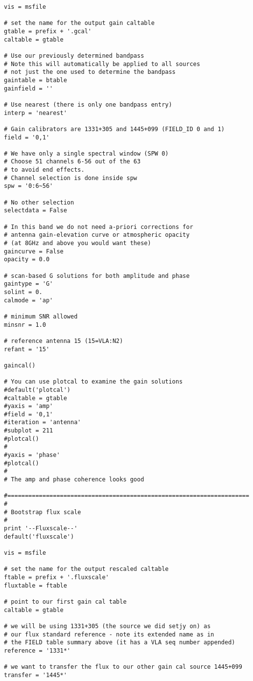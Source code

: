 \begin{verbatim}
vis = msfile

# set the name for the output gain caltable
gtable = prefix + '.gcal'
caltable = gtable

# Use our previously determined bandpass
# Note this will automatically be applied to all sources
# not just the one used to determine the bandpass
gaintable = btable
gainfield = ''

# Use nearest (there is only one bandpass entry)
interp = 'nearest'

# Gain calibrators are 1331+305 and 1445+099 (FIELD_ID 0 and 1)
field = '0,1'

# We have only a single spectral window (SPW 0)
# Choose 51 channels 6-56 out of the 63
# to avoid end effects.
# Channel selection is done inside spw
spw = '0:6~56'

# No other selection
selectdata = False

# In this band we do not need a-priori corrections for
# antenna gain-elevation curve or atmospheric opacity
# (at 8GHz and above you would want these)
gaincurve = False
opacity = 0.0

# scan-based G solutions for both amplitude and phase
gaintype = 'G'
solint = 0.
calmode = 'ap'

# minimum SNR allowed
minsnr = 1.0

# reference antenna 15 (15=VLA:N2)
refant = '15'

gaincal()

# You can use plotcal to examine the gain solutions
#default('plotcal')
#caltable = gtable
#yaxis = 'amp'
#field = '0,1'
#iteration = 'antenna'
#subplot = 211
#plotcal()
#
#yaxis = 'phase'
#plotcal()
#
# The amp and phase coherence looks good

#=====================================================================
#
# Bootstrap flux scale
#
print '--Fluxscale--'
default('fluxscale')

vis = msfile

# set the name for the output rescaled caltable
ftable = prefix + '.fluxscale'
fluxtable = ftable

# point to our first gain cal table
caltable = gtable

# we will be using 1331+305 (the source we did setjy on) as
# our flux standard reference - note its extended name as in
# the FIELD table summary above (it has a VLA seq number appended)
reference = '1331*'

# we want to transfer the flux to our other gain cal source 1445+099
transfer = '1445*'


\end{verbatim}
